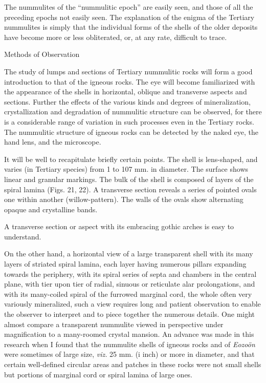 \documentclass[a4paper, 12pt, oneside]{article}
\begin{document}
The nummulites of the ``nummulitic epoch'' are easily seen, and those of all the preceding epochs not easily seen. The explanation of the enigma of the Tertiary nummulites is simply that the individual forms of the shells of the older deposits have become more or less obliterated, or, at any rate, difficult to trace.

Methods of Observation

The study of lumps and sections of Tertiary nummulitic rocks will form a good introduction to that of the igneous rocks. The eye will become familiarized with the appearance of the shells in horizontal, oblique and transverse aspects and sections. Further the effects of the various kinds and degrees of mineralization, crystallization and degradation of nummulitic structure can be observed, for there is a considerable range of variation in such processes even in the Tertiary rocks. The nummulitic structure of igneous rocks can be detected by the naked eye, the hand lens, and the microscope.

It will be well to recapitulate briefly certain points. The shell is lens-shaped, and varies (in Tertiary species) from 1 to 107 mm. in diameter. The surface shows linear and granular markings. The bulk of the shell is composed of layers of the spiral lamina (Figs. 21, 22). A transverse section reveals a series of pointed ovals one within another (willow-pattern). The walls of the ovals show alternating opaque and crystalline bands.

A transverse section or aspect with its embracing gothic arches is easy to understand.

On the other hand, a horizontal view of a large transparent shell with its many layers of striated spiral lamina, each layer having numerous pillars expanding towards the periphery, with its spiral series of septa and chambers in the central plane, with tier upon tier of radial, sinuous or reticulate alar prolongations, and with its many-coiled spiral of the furrowed marginal cord, the whole often very variously mineralized, such a view requires long and patient observation to enable the observer to interpret and to piece together the numerous details. One might almost compare a transparent nummulite viewed in perspective under magnification to a many-roomed crystal mansion. An advance was made in this research when I found that the nummulite shells of igneous rocks and of \emph{Eozoön} were sometimes of large size, \emph{viz.} 25 mm. (i inch) or more in diameter, and that certain well-defined circular areas and patches in these rocks were not small shells but portions of marginal cord or spiral lamina of large ones.
\end{document}
